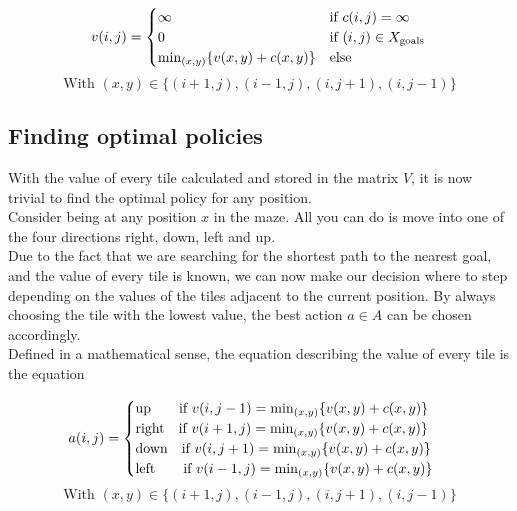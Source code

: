 \documentclass[conference]{IEEEtran}
\begin{document}
\begin{small}
\begin{equation}
v(i,j) =
  \begin{cases}
  \centering
    \infty & \text{if } c(i,j) = \infty\\
    0 & \text{if } (i,j) \in X_\text{goals}\\
    \min_{(x,y)} \{v(x,y) + c(x,y)\} & \text{else}\\
  \end{cases}\\
\end{equation}
\begin{equation*}
\text{With } (x,y) \in \{(i+1,j),(i-1,j),(i,j+1),(i,j-1)\}
\end{equation*}
\end{small}

\subsection{Finding optimal policies}
With the value of every tile calculated and stored in the matrix $V$, it is now trivial to find the optimal policy for any position.\\
Consider being at any position $x$ in the maze. All you can do is move into one of the four directions right, down, left and up. \\
Due to the fact that we are searching for the shortest path to the nearest goal, and the value of every tile is known, we can now make our decision where to step depending on the values of the tiles adjacent to the current position. By always choosing the tile with the lowest value, the best action $a \in A$ can be chosen accordingly.\\
Defined in a mathematical sense, the equation describing the value of every tile is the equation 

\begin{small}
\begin{equation} 
\label{policy}
a(i,j)=
	\begin{cases}
		\text{up} \quad \quad \text{if } v(i,j-1) = \min_{(x,y)} \{v(x,y) + c(x,y)\} \\
		\text{right} \quad \text{if } v(i+1,j) = \min_{(x,y)} \{v(x,y) + c(x,y)\} \\
		\text{down} \quad \text{if } v(i,j+1) = \min_{(x,y)} \{v(x,y) + c(x,y)\} \\
		\text{left} \quad \quad \text{if } v(i-1,j) = \min_{(x,y)} \{v(x,y) + c(x,y)\} \\
	\end{cases} \\
\end{equation}
\begin{equation*}
\text{With } (x,y) \in \{(i+1,j),(i-1,j),(i,j+1),(i,j-1)\}
\end{equation*}
\end{small}
\end{document}
